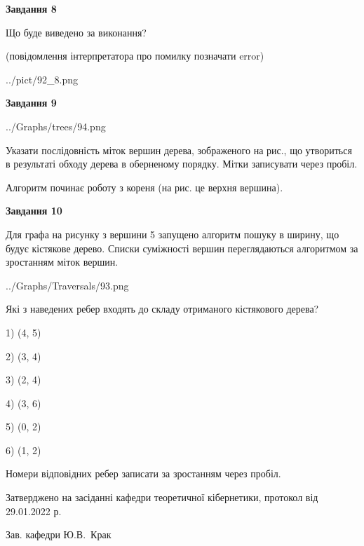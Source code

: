 \documentclass[12pt, ukrainian]{article}
\begin{document}
{\begin {large}
{\begin {center}\textbf{Завдання 8}\end {center}}\par
Що буде виведено за виконання?\par
 (повідомлення інтерпретатора про помилку позначати error)\par
\begin{center}
	{../pict/92_8.png}
\end{center}
\newpage

{\begin {center}\textbf{Завдання 9}\end {center}}\par

\begin{center}
	{../Graphs/trees/94.png}
\end{center}
Указати послідовність міток вершин дерева, зображеного на рис., що утвориться в результаті обходу дерева в оберненому порядку. Мітки записувати через пробіл.\par Алгоритм починає роботу з кореня (на рис. це верхня вершина).\par
\newpage

{\begin {center}\textbf{Завдання 10}\end {center}}\par
Для графа на рисунку з вершини 5 запущено алгоритм пошуку в ширину, що будує кістякове дерево. Списки суміжності вершин переглядаються алгоритмом за зростанням міток вершин.\par
\begin{center}
	{../Graphs/Traversals/93.png}
\end{center}
\par Які з наведених ребер входять до складу отриманого кістякового дерева?\par
1) (4, 5)\par
2) (3, 4)\par
3) (2, 4)\par
4) (3, 6)\par
5) (0, 2)\par
6) (1, 2)\par
{\vskip 15pt} Номери відповідних ребер записати за зростанням через пробіл.\par
\newpage


\end {large}
}
{\smallskip \begin {small} Затверджено на засіданні кафедри теоретичної кібернетики, протокол  від   29.01.2022 р.\par\smallskip\smallskip
{\parbox {6.5 cm}{Зав. кафедри \dotfill Ю.В.~Крак}} \end{small}}
\end{document}
